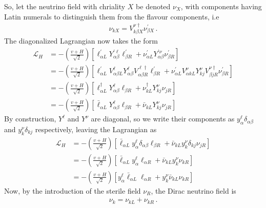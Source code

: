So, let the neutrino field with chriality $X$ be denoted $\nu_X$, with components having Latin numerals to distinguish them from the flavour components, i.e 
\begin{align}\label{eq:nu_rotation}
    \nu_{k X} =  V_{k\beta X}^{\nu \dagger} \nu_{\beta X}^\prime\,.
\end{align}
The diagonalized Lagrangian now takes the form 
\begin{align}
    \mathcal{L}_{H} &= -\left( \frac{v + H}{\sqrt{2}} \right) \left[\ell_{\alpha L}^{\prime} Y_{\alpha \beta}^{\prime \ell} \ell_{\beta R}^{\prime} + \nu_{\alpha L}^{\prime} Y_{\alpha \beta}^{\prime \nu} \nu_{\beta R}^{\prime}\right] \nonumber \\
    &= -\left( \frac{v + H}{\sqrt{2}} \right) \left[\ell_{\alpha L}^{\prime} V_{\alpha \beta L}^{\ell} Y_{\alpha \beta}^{ \ell} V_{\alpha \beta R}^{\ell \dagger} \ell_{\beta R}^{\prime}
    + \nu_{\alpha L}^{\prime} V_{\alpha k L}^{\nu} Y_{kj}^{\nu} V_{\beta j  R}^{\nu \dagger} \nu_{\beta R}^{\prime}\right] \nonumber \\
    &= -\left( \frac{v + H}{\sqrt{2}} \right) \left[\ell_{\alpha L}^\dagger Y_{\alpha \beta}^{ \ell} \ell_{\beta R} + \nu_{k L}^{\dagger} Y_{kj}^{ \nu} \nu_{j R}\right] \nonumber \\
    &= -\left( \frac{v + H}{\sqrt{2}} \right) \left[\bar{\ell}_{\alpha L} Y_{\alpha \beta}^{ \ell} \ell_{\beta R} + \bar{\nu}_{k L} Y_{kj}^\nu \nu_{j R}\right]
\end{align}
By construction, $Y^\ell$ and $Y^\nu$ are diagonal, so we write their components as $y_{\alpha}^{\ell} \delta_{\alpha \beta}$ and $y_{k}^{\nu} \delta_{k j}$ respectively, leaving the Lagrangian as 
\begin{align}\label{eq:L_H}
    \mathcal{L}_{H} 
    &=-\left( \frac{v + H}{\sqrt{2}} \right) \left[\bar{\ell}_{\alpha L} y_{\alpha}^{\ell} \delta_{\alpha \beta} \ell_{\beta R} + \bar{\nu}_{k L} y_{k}^{\nu} \delta_{k j} \nu_{j R}\right] \nonumber \\
    &=-\left( \frac{v + H}{\sqrt{2}} \right) \left[\bar{\ell}_{\alpha L} y_{\alpha}^{\ell}  \ell_{\alpha R} + \bar{\nu}_{k L} y_{k}^{\nu} \nu_{k R}\right] \nonumber \\
    &=-\left( \frac{v + H}{\sqrt{2}} \right) \left[ y_{\alpha}^{\ell}  \bar{\ell}_{\alpha L}\ell_{\alpha R} +  y_{k}^{\nu}\bar{\nu}_{k L} \nu_{k R}\right] 
\end{align}
Now, by the introduction of the sterile field $\nu_R$, the Dirac neutrino field is
\begin{align}
    \nu_k = \nu_{kL} + \nu_{kR}\,.
\end{align}
